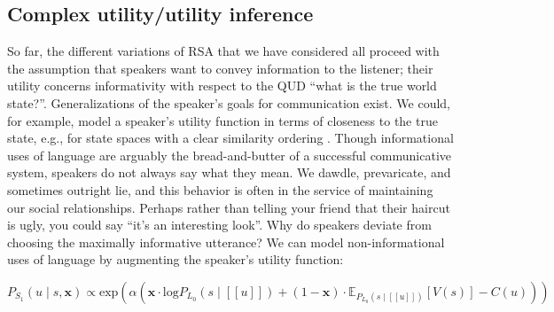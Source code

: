 \documentclass{sp}
\newcommand{\sem}[1]{\ensuremath{[\![#1]\!]}}
\begin{document}
\subsection{Complex utility/utility inference}
 
 So far, the different variations of RSA that we have considered all proceed with the assumption that speakers want to convey information to the listener; their utility concerns informativity with respect to the QUD ``what is the true world state?''. Generalizations of the speaker's goals for communication exist. We could, for example, model a speaker's utility function in terms of closeness to the true state, e.g., for state spaces with a clear similarity ordering \citep{Franke2014:Typical-use-of-}. Though informational uses of language are arguably the bread-and-butter of a successful communicative system, speakers do not always say what they mean. We dawdle, prevaricate, and sometimes outright lie, and this behavior is often in the service of maintaining our social relationships. Perhaps rather than telling your friend that their haircut is ugly, you could say ``it's an interesting look''. Why do speakers deviate from choosing the maximally informative utterance? We can model non-informational uses of language by augmenting the speaker's utility function: 
  
 \begin{equation} \label{S1-polite}
P_{S_1}(u\mid s, \textbf{x}) \propto \textrm{exp}(\alpha  (
 \textbf{x} \cdot \textrm{log}P_{L_0}(s \mid \sem{u}) + 
 (1 - \textbf{x}) \cdot  \mathbb{E}_{P_{L_0}(s \mid \sem{u})}[V(s)] - C(u)))
\end{equation}
\end{document}
